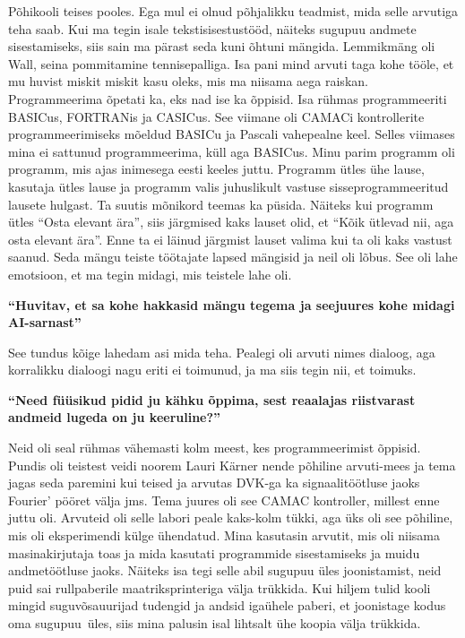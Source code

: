 Põhikooli teises pooles. Ega mul ei olnud põhjalikku teadmist, mida selle
arvutiga teha saab. Kui ma tegin isale tekstisisestustööd, näiteks sugupuu
andmete sisestamiseks, siis sain ma pärast seda kuni õhtuni mängida. Lemmikmäng
oli Wall, seina pommitamine tennisepalliga. Isa pani mind
arvuti taga kohe tööle, et mu huvist miskit miskit kasu oleks, mis ma niisama
aega raiskan. Programmeerima õpetati ka, eks nad ise ka õppisid. Isa rühmas
programmeeriti BASICus, FORTRANis ja
CASICus. See viimane oli CAMACi kontrollerite
programmeerimiseks mõeldud BASICu ja Pascali vahepealne
keel. Selles viimases
mina ei sattunud programmeerima, küll aga BASICus. Minu parim programm oli
programm, mis ajas inimesega eesti keeles juttu. Programm ütles ühe lause,
kasutaja ütles lause ja programm valis juhuslikult vastuse sisseprogrammeeritud
lausete hulgast. Ta suutis mõnikord teemas ka püsida. Näiteks kui programm
ütles \enquote{Osta elevant ära}, siis järgmised kaks lauset olid, et
\enquote{Kõik ütlevad nii, aga osta elevant ära}. Enne ta ei läinud järgmist
lauset valima kui ta oli kaks vastust saanud. Seda mängu teiste töötajate
lapsed mängisid ja neil oli lõbus. See oli lahe emotsioon, et ma tegin midagi,
mis teistele lahe oli.

\textbf{\enquote{Huvitav, et sa kohe hakkasid mängu tegema ja seejuures kohe
midagi AI-sarnast}}

See tundus kõige lahedam asi mida teha. Pealegi oli arvuti nimes dialoog, aga
korralikku dialoogi nagu eriti ei toimunud, ja ma siis tegin nii, et toimuks.

\textbf{\enquote{Need füüsikud pidid ju kähku õppima, sest reaalajas
riistvarast andmeid lugeda on ju keeruline?}}

Neid oli seal rühmas vähemasti kolm meest, kes programmeerimist õppisid. Pundis
oli teistest veidi noorem Lauri Kärner nende põhiline arvuti-mees ja tema jagas
seda paremini kui teised ja arvutas DVK-ga ka signaalitöötluse jaoks Fourier'
pööret välja jms. Tema juures oli see CAMAC kontroller, millest enne juttu oli.
Arvuteid oli selle labori peale kaks-kolm tükki, aga üks oli see põhiline, mis
oli eksperimendi külge ühendatud. Mina kasutasin arvutit, mis oli niisama
masinakirjutaja toas ja mida kasutati programmide sisestamiseks ja muidu
andmetöötluse jaoks. Näiteks isa tegi selle abil sugupuu üles joonistamist,
neid puid sai rullpaberile maatriksprinteriga välja trükkida. Kui hiljem tulid kooli
mingid suguvõsauurijad tudengid ja andsid igaühele paberi, et joonistage kodus
oma sugupuu üles, siis mina palusin isal lihtsalt ühe koopia välja trükkida.


